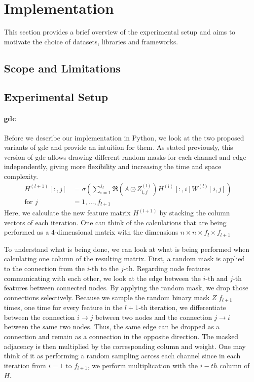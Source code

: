 \chapter{Implementation}
\label{sec:implement}

This section provides a brief overview of the experimental setup and aims to motivate the choice of datasets, libraries and frameworks.

\section{Scope and Limitations}
\label{sec:implement:scope}




\section{Experimental Setup}
\label{sec:implement:setup}
\subsubsection{\Ac{gdc}}
Before we describe our implementation in Python, we look at the two proposed variants of \ac{gdc} and provide an intuition for them.
As stated previously, this version of \ac{gdc} allows drawing different random masks for each channel and edge independently, giving more flexibility and increasing the time and space complexity.
\begin{align*}
    H^{(l+1)}[:,j] & = \sigma \left(\sum_{i=1}^{f_{l}}\mathfrak{R}\left(A \odot Z_{i,j}^{(l)}\right)H^{(l)}[:,i]W^{(l)}[i,j]\right) \\
    \text{for } j  & = 1,..., f_{l+1}
\end{align*}
Here, we calculate the new feature matrix $H^{(l+1)}$ by stacking the column vectors of each iteration. One can think of the calculations that are being performed as a $4$-dimensional matrix with the dimensions $n\times n\times f_{l}\times f_{l+1}$

To understand what is being done, we can look at what is being performed when calculating one column of the resulting matrix. First, a random mask is applied to the connection from the $i$-th to the $j$-th. Regarding node features communicating with each other, we look at the edge between the $i$-th and $j$-th features between connected nodes. By applying the random mask, we drop those connections selectively. Because we sample the random binary mask $Z$ $f_{l+1}$ times, one time for every feature in the $l+1$-th iteration, we differentiate between the connection $i \rightarrow j$ between two nodes and the connection $j \rightarrow i$ between the same two nodes. Thus, the same edge can be dropped as a connection and remain as a connection in the opposite direction. The masked adjacency is then multiplied by the corresponding column and weight.
One may think of it as performing a random sampling across each channel since in each iteration from $i=1$ to $f_{l+1}$, we perform multiplication with the $i-th$ column of $H$.

